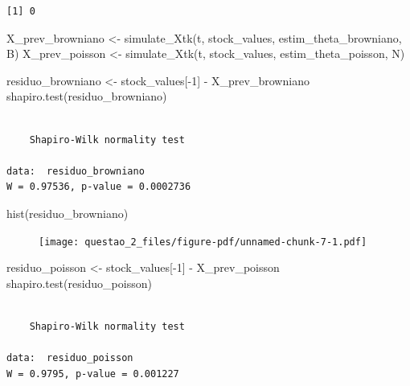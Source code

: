 \documentclass[
  letterpaper,
  DIV=11,
  numbers=noendperiod]{scrreprt}
\newenvironment{Shaded}{\begin{snugshade}}{\end{snugshade}}
\newcommand{\DecValTok}[1]{\textcolor[rgb]{0.68,0.00,0.00}{#1}}
\newcommand{\FunctionTok}[1]{\textcolor[rgb]{0.28,0.35,0.67}{#1}}
\newcommand{\NormalTok}[1]{\textcolor[rgb]{0.00,0.23,0.31}{#1}}
\newcommand{\OtherTok}[1]{\textcolor[rgb]{0.00,0.23,0.31}{#1}}
\newcommand{\SpecialCharTok}[1]{\textcolor[rgb]{0.37,0.37,0.37}{#1}}
\begin{document}
\begin{verbatim}
[1] 0
\end{verbatim}

\begin{Shaded}
\begin{Highlighting}[]
\NormalTok{X\_prev\_browniano }\OtherTok{\textless{}{-}} \FunctionTok{simulate\_Xtk}\NormalTok{(t, stock\_values, estim\_theta\_browniano, B)}
\NormalTok{X\_prev\_poisson }\OtherTok{\textless{}{-}} \FunctionTok{simulate\_Xtk}\NormalTok{(t, stock\_values, estim\_theta\_poisson, N)}

\NormalTok{residuo\_browniano }\OtherTok{\textless{}{-}}\NormalTok{ stock\_values[}\SpecialCharTok{{-}}\DecValTok{1}\NormalTok{] }\SpecialCharTok{{-}}\NormalTok{ X\_prev\_browniano}
\FunctionTok{shapiro.test}\NormalTok{(residuo\_browniano)}
\end{Highlighting}
\end{Shaded}

\begin{verbatim}

    Shapiro-Wilk normality test

data:  residuo_browniano
W = 0.97536, p-value = 0.0002736
\end{verbatim}

\begin{Shaded}
\begin{Highlighting}[]
\FunctionTok{hist}\NormalTok{(residuo\_browniano)}
\end{Highlighting}
\end{Shaded}

\begin{figure}[H]

{\centering \texttt{[image: questao\_2\_files/figure-pdf/unnamed-chunk-7-1.pdf]}

}

\end{figure}

\begin{Shaded}
\begin{Highlighting}[]
\NormalTok{residuo\_poisson }\OtherTok{\textless{}{-}}\NormalTok{ stock\_values[}\SpecialCharTok{{-}}\DecValTok{1}\NormalTok{] }\SpecialCharTok{{-}}\NormalTok{ X\_prev\_poisson}
\FunctionTok{shapiro.test}\NormalTok{(residuo\_poisson)}
\end{Highlighting}
\end{Shaded}

\begin{verbatim}

    Shapiro-Wilk normality test

data:  residuo_poisson
W = 0.9795, p-value = 0.001227
\end{verbatim}
\end{document}
